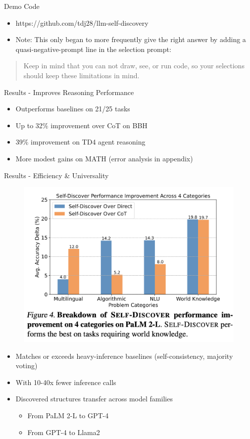 \documentclass[aspectratio=169]{beamer}
\begin{document}
\begin{frame}{Demo Code}

\begin{itemize}
\item https://github.com/tdj28/llm-self-discovery \pause
\item Note: This only began to more frequently give the right answer by adding a quasi-negative-prompt line in the selection prompt: \pause
\end{itemize}

\vspace{3mm}

\begin{quote}
    Keep in mind that you can not draw, see, or run code, so your selections should keep these limitations in mind.
\end{quote}



\end{frame}


\begin{frame}{Results - Improves Reasoning Performance}

\begin{itemize}
\item Outperforms baselines on 21/25 tasks \pause
\item Up to 32\% improvement over CoT on BBH \pause
\item 39\% improvement on TD4 agent reasoning \pause
\item More modest gains on MATH (error analysis in appendix)
\end{itemize}
\end{frame}

\begin{frame}{Results - Efficiency & Universality}

\begin{center}
\begin{figure}
    \centering
    \includegraphics[width=0.35\linewidth]{results1.png}
\end{figure}
\end{center}
\begin{itemize}
\item Matches or exceeds heavy-inference baselines (self-consistency, majority voting) \pause
\item With 10-40x fewer inference calls \pause
\item Discovered structures transfer across model families \pause
\begin{itemize}
\item From PaLM 2-L to GPT-4
\item From GPT-4 to Llama2
\end{itemize}
\end{itemize}

\end{frame}
\end{document}
